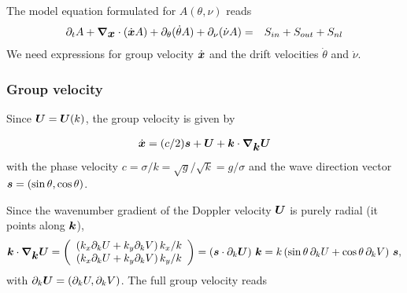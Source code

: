 \documentclass[12pt]{article}
\newif\ifdetail
\newcommand{\beq}  { \begin{eqnarray} }
\newcommand{\eeq}  { \end{eqnarray}}
\renewcommand{\v}[1]{{\mbox{\boldmath$ #1 $}}}  %
\newcommand{\pt}[1]{{\partial_t #1}}
\newcommand{\Vec}[1]{\left(\begin{array}{c} #1 \end{array}\right) }
\newcommand{\p}{{\partial}}
\newcommand{\vn}{{\v \nabla}}
\newcommand{\lk}{\left(}
\newcommand{\rk}{\right)}
\begin{document}
The model equation formulated for $A(\theta,\nu)$ reads
\beq \label{eq6}
  \pt{ A}    +  \vn_{\v x}  \cdot   (\dot{\v x} A ) +\p_{\theta}  (\dot{\theta} A  )
 + \p_{\nu} ( \dot{\nu} A)
 &=&S_{in} + S_{out} + S_{nl} 
\eeq
We need expressions for group velocity $\dot{\v x}$ and the drift velocities $\dot{\theta}$
and $\dot \nu$.

\subsubsection*{Group velocity}

Since $\v U = \v U(k)$, the group velocity is given by
\ifdetail
\beq
 \dot x &=& \p_{k_x} \Omega = \p_{k_x} \sigma  + \p_{k_x}  Uk_x  + \p_{k_x}  V k_y  
 =   \sqrt{g} \p_{k_x}  (k_x^2 + k_y^2)^{1/4}+ U + k_x \p_{k_x}  U + k_y\p_{k_x}  V 
 \\ &=&  (c /2)  k_x/k + U + \v k \cdot \p_{k_x}  \v U 
 \\
 \dot y &=& \p_{k_y} \Omega = (c /2)  k_y/k+ \p_{k_y}  Uk_x  + \p_{k_y}  V k_y  
 =  (c /2)  k_y/k+ V + \v k \cdot \p_{k_y}  \v U   
 \eeq
 \fi
 \beq
 \dot{\v x} =  (c /2)  \v s + \v U + \v k \cdot \vn_{\v k}  \v U 
 \eeq
with the phase velocity  $c = \sigma/k = \sqrt{g} /\sqrt{k} = g /\sigma $
and the wave direction vector $\v s = (\sin \theta,\cos \theta)$.
\ifdetail
Note that
\beq 
\vn_{\v k}  ( \v  k \cdot    \v U)   = \Vec{  \p_{k_x} (U k_x + V k_y) \\ \p_{k_y} (U k_x + V k_y) }
= \v U + \Vec{   k_x  \p_{k_x} U  + k_y   \p_{k_x}  V \\  k_x \p_{k_y} U  +k_y  \p_{k_y} V   }
\\
= 
 \v U + \Vec{   (k_x  \p_{k} U  + k_y    \p_{k}  V) k_x/k  \\  
 (k_x \p_{k} U  +k_y  \p_{k} V) k_y/k    }
\eeq
with $ \p_{k_x} k  = %
k_x/k$
and  $\v U = \v U(k)$
\fi
Since the wavenumber gradient of the Doppler velocity $\v U$
is purely radial (it points along $\v k$),
\beq \label{eq:kgradkU}
\v k \cdot \vn_{\v k} \v U
= \Vec{ (k_x \p_k U + k_y \p_k V)\, k_x/k \\
        (k_x \p_k U + k_y \p_k V)\, k_y/k }
= \lk \v s \cdot \p_k \v U \rk \, \v k
= k \lk \sin\theta\, \p_k U + \cos\theta\, \p_k V \rk \, \v s ,
\eeq
with  $\p_k \v U = (\p_k U, \p_k V)$. The full group velocity reads
\end{document}
